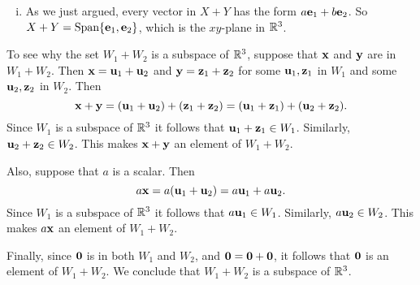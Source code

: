 \begin{example}
\begin{enumerate}[i.]
	\item As we just argued, every vector in $X+Y$ has the form $a\mathbf{e}_1+b\mathbf{e}_2$. So $X+Y = \text{Span}\{\mathbf{e}_1,\mathbf{e}_2\}$, which is the $xy$-plane in $\mathbb{R}^3$. 
	
	\end{enumerate}

\item To see why the set $W_1+W_2$ is a subspace of $\mathbb{R}^3$, suppose that $\mathbf{x}$ and $\mathbf{y}$ are in $W_1+W_2$. Then $\mathbf{x} = \mathbf{u}_1+\mathbf{u}_2$ and $\mathbf{y} = \mathbf{z}_1+\mathbf{z}_2$ for some $\mathbf{u}_1, \mathbf{z}_1$ in $W_1$ and some $\mathbf{u}_2, \mathbf{z}_2$ in $W_2$. Then
\[\mathbf{x}+\mathbf{y} = (\mathbf{u}_1+\mathbf{u}_2)+(\mathbf{z}_1+\mathbf{z}_2) = (\mathbf{u}_1+\mathbf{z}_1)+(\mathbf{u}_2+\mathbf{z}_2).\]
Since $W_1$ is a subspace of $\mathbb{R}^3$ it follows that $\mathbf{u}_1+\mathbf{z}_1 \in W_1$. Similarly, $\mathbf{u}_2+\mathbf{z}_2 \in W_2$. This makes $\mathbf{x} + \mathbf{y}$ an element of $W_1+W_2$. 

Also, suppose that $a$ is a scalar. Then
\[a \mathbf{x} = a(\mathbf{u}_1+\mathbf{u}_2) = a\mathbf{u}_1 + a\mathbf{u}_2.\]
Since $W_1$ is a subspace of $\mathbb{R}^3$ it follows that $a\mathbf{u}_1 \in W_1$. Similarly, $a\mathbf{u}_2 \in W_2$. This makes $a\mathbf{x}$ an element of $W_1+W_2$. 

Finally, since $\mathbf{0}$ is in both $W_1$ and $W_2$, and $\mathbf{0} = \mathbf{0} + \mathbf{0}$, it follows that $\mathbf{0}$ is an element of $W_1+W_2$. We conclude that $W_1+W_2$ is a subspace of $\mathbb{R}^3$. 

\ea

\end{example}

\label{sec:rn_summ}

